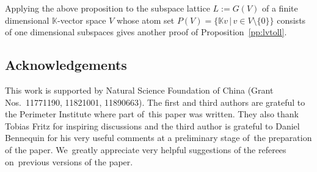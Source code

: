 \documentclass[pdftex]{sigma}
\numberwithin{equation}{section}
\newcommand{\K}{\mathbb{K}}
\begin{document}
\begin{Remark}
Applying the above proposition to the subspace lattice $L:=G(V)$ of a finite dimensional $\K$-vector space $V$ whose atom set $P(V)=\{\K v\,|\, v\in V\setminus \{0\}\}$ consists of one dimensional subspaces gives another proof of Proposition~\ref{pp:lvtoll}.
\end{Remark}

{\sloppy\subsection*{Acknowledgements} This work is supported by Natural Science Foundation of China (Grant Nos.\ 11771190, 11821001, 11890663). The first and third authors are grateful to the Perimeter Institute where part of~this paper was written.
They also thank Tobias Fritz for inspiring discussions {and the third author is grateful to Daniel Bennequin for his very useful comments at a preliminary stage of~the preparation of the paper}. We~greatly appreciate very helpful suggestions of the referees on~previous versions of the paper.

}
\end{document}

